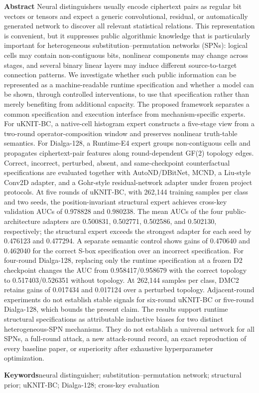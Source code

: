 \documentclass{templates/cjc-utf8}
\newcommand{\enkeywords}{neural distinguisher; substitution--permutation network; structural prior; uKNIT-BC; Dialga-128; cross-key evaluation}
\begin{document}
{\fontsize{8.2bp}{10bp}\selectfont
\noindent\textbf{Abstract\quad}
Neural distinguishers usually encode ciphertext pairs as regular bit vectors or tensors and expect a generic convolutional, residual, or automatically generated network to discover all relevant statistical relations. This representation is convenient, but it suppresses public algorithmic knowledge that is particularly important for heterogeneous substitution--permutation networks (SPNs): logical cells may contain non-contiguous bits, nonlinear components may change across stages, and several binary linear layers may induce different source-to-target connection patterns. We investigate whether such public information can be represented as a machine-readable runtime specification and whether a model can be shown, through controlled interventions, to use that specification rather than merely benefiting from additional capacity. The proposed framework separates a common specification and execution interface from mechanism-specific experts. For uKNIT-BC, a native-cell histogram expert constructs a five-stage view from a two-round operator-composition window and preserves nonlinear truth-table semantics. For Dialga-128, a Runtime-E4 expert groups non-contiguous cells and propagates ciphertext-pair features along round-dependent GF(2) topology edges. Correct, incorrect, perturbed, absent, and same-checkpoint counterfactual specifications are evaluated together with AutoND/DBitNet, MCND, a Liu-style Conv2D adapter, and a Gohr-style residual-network adapter under frozen project protocols. At five rounds of uKNIT-BC, with 262,144 training samples per class and two seeds, the position-invariant structural expert achieves cross-key validation AUCs of 0.978828 and 0.980238. The mean AUCs of the four public-architecture adapters are 0.500831, 0.502771, 0.502586, and 0.502130, respectively; the structural expert exceeds the strongest adapter for each seed by 0.476123 and 0.477294. A separate semantic control shows gains of 0.470640 and 0.462040 for the correct S-box specification over an incorrect specification. For four-round Dialga-128, replacing only the runtime specification at a frozen D2 checkpoint changes the AUC from 0.958417/0.958679 with the correct topology to 0.517403/0.526351 without topology. At 262,144 samples per class, DMC2 retains gains of 0.017434 and 0.017124 over a perturbed topology. Adjacent-round experiments do not establish stable signals for six-round uKNIT-BC or five-round Dialga-128, which bounds the present claim. The results support runtime structural specifications as attributable inductive biases for two distinct heterogeneous-SPN mechanisms. They do not establish a universal network for all SPNs, a full-round attack, a new attack-round record, an exact reproduction of every baseline paper, or superiority after exhaustive hyperparameter optimization.

\vspace{1mm}
\noindent\textbf{Keywords\quad}\enkeywords
\par}
\end{document}
